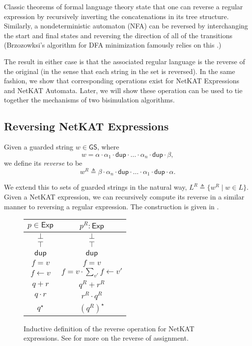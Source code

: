 \documentclass[acmsmall,dvipsnames,nonacm]{acmart}
\newcommand\pk{\alpha}
\newcommand\pkp{\beta}
\newcommand\dup{\mathsf{dup}}
\newcommand\Exp{\mathsf{Exp}}
\newcommand\ddd{\cdot\dup\cdot}
\newcommand\GS{\mathsf{GS}}
\newcommand\NetKAT{\textsf{NetKAT}\xspace}
\newcommand\zero{\bot}%
\newcommand\one{\top}%
\begin{document}
Classic theorems of formal language theory state that one can reverse a regular
expression by recursively inverting the concatenations in its tree structure.
Similarly, a nondeterministic automaton (NFA) can be reversed by interchanging the
start and final states and reversing the direction of all of the transitions
(Brzozowksi's algorithm for DFA minimization famously relies on this
\cite{brzozowski1962}.)

The result in either case is that the associated regular language is the reverse
of the original (in the sense that each string in the set is reversed).  In the
same fashion, we show that corresponding operations exist for \NetKAT Expressions
and \NetKAT Automata. Later, we will show these operation can be used to tie
together the mechanisms of two bisimulation algorithms.

\subsection{Reversing \NetKAT Expressions}\label{sec:rev-exp}

Given a guarded string $w \in \GS$, where
\[w = \pk\cdot \pk_1 \cdot \dup \cdot \ldots \cdot \pk_n \ddd \pkp,\] we define its \emph{reverse} to be
\[w^R \triangleq \pkp \cdot \pk_{n} \ddd \ldots \cdot \pk_1 \ddd \pk.\]

We extend this to sets of guarded strings in the natural way, $L^R \triangleq \{w^R \mid w \in L\}$.
Given a \NetKAT expression, we can recursively compute its reverse in a
similar manner to reversing a regular expression. The construction is given
in .

\begin{figure}
\begin{tabular}{|c|c|}
    \hline
    $p\in\Exp$ & $p^R\colon \Exp$ \\
    \hline
    $\zero$ & $\zero$ \\
    $\one$ & $\one$ \\
    $\dup$ & $\dup$ \\
    $f = v$ & $f = v$ \\
    $f \gets v$ & $f = v \cdot \sum_{v'} f \gets v'$ \\
    $q + r$ & $q^R + r^R$ \\
    $q \cdot r$ & $r^R \cdot q^R$ \\
    $q^\star$ & $(q^R)^\star$ \\
    \hline
\end{tabular}
    \caption{Inductive definition of the reverse operation for \NetKAT
    expressions. See  for more on the reverse of assignment.}
\label{fig:reverse-exp}
\end{figure}
\end{document}
